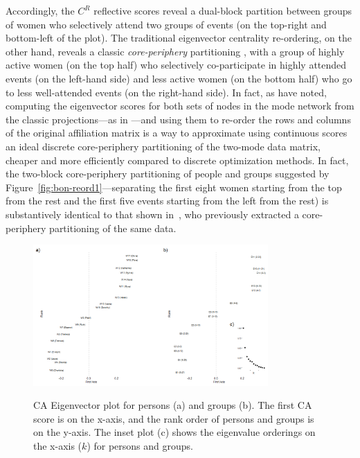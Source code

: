 \documentclass[a4paper,fleqn]{cas-sc}
\begin{document}
Accordingly, the $C^R$ reflective scores reveal a dual-block partition between groups of women who selectively attend two groups of events (on the top-right and bottom-left of the plot). The traditional eigenvector centrality re-ordering, on the other hand, reveals a classic \textit{core-periphery} partitioning \citep{borgatti2000models}, with a group of highly active women (on the top half) who selectively co-participate in highly attended events (on the left-hand side) and less active women (on the bottom half) who go to less well-attended events (on the right-hand side). In fact, as \citet[p. 206]{everett2013dual} have noted, computing the eigenvector scores for both sets of nodes in the mode network from the classic \citet{breiger1974duality} projections---as in \citet{bonacich1991simultaneous}---and using them to re-order the rows and columns of the original affiliation matrix is a way to approximate using continuous scores an ideal discrete core-periphery partitioning of the two-mode data matrix, cheaper and more efficiently compared to discrete optimization methods. In fact, the two-block core-periphery partitioning of people and groups suggested by Figure~\ref{fig:bon-reord1}---separating the first eight women starting from the top from the rest and the first five events starting from the left from the rest) is substantively identical to that shown in~\citet[206, Table 2]{everett2013dual}, who previously extracted a core-periphery partitioning of the same data.

\begin{figure}[ht!]
    \centering
        \includegraphics[width=0.8\textwidth]{Plots/ca-eigvec.png}            
        \label{fig:eigvec}
    \caption{CA Eigenvector plot for persons (a) and groups (b). The first CA score is on the x-axis, and the rank order of persons and groups is on the y-axis. The inset plot (c) shows the eigenvalue orderings on the x-axis ($k$) for persons and groups.}
    \label{fig:ca-eigvec}
\end{figure}
\end{document}
